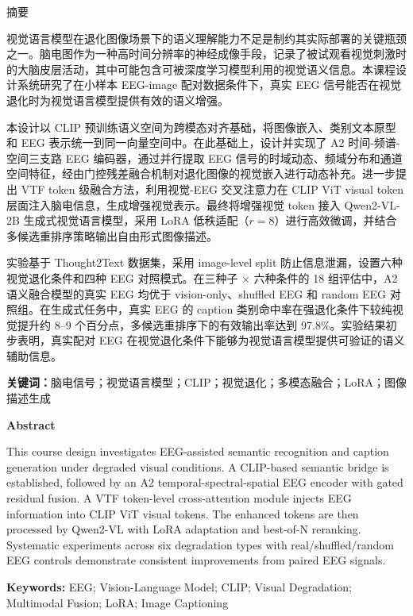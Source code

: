 \begin{center}
{\heitifont{} 摘\quad 要}
\end{center}

视觉语言模型在退化图像场景下的语义理解能力不足是制约其实际部署的关键瓶颈之一。脑电图作为一种高时间分辨率的神经成像手段，记录了被试观看视觉刺激时的大脑皮层活动，其中可能包含可被深度学习模型利用的视觉语义信息。本课程设计系统研究了在小样本 EEG-image 配对数据条件下，真实 EEG 信号能否在视觉退化时为视觉语言模型提供有效的语义增强。

本设计以 CLIP 预训练语义空间为跨模态对齐基础，将图像嵌入、类别文本原型和 EEG 表示统一到同一向量空间中。在此基础上，设计并实现了 A2 时间-频谱-空间三支路 EEG 编码器，通过并行提取 EEG 信号的时域动态、频域分布和通道空间特征，经由门控残差融合机制对退化图像的视觉嵌入进行动态补充。进一步提出 VTF token 级融合方法，利用视觉-EEG 交叉注意力在 CLIP ViT visual token 层面注入脑电信息，生成增强视觉表示。最终将增强视觉 token 接入 Qwen2-VL-2B 生成式视觉语言模型，采用 LoRA 低秩适配（$r=8$）进行高效微调，并结合多候选重排序策略输出自由形式图像描述。

实验基于 Thought2Text 数据集，采用 image-level split 防止信息泄漏，设置六种视觉退化条件和四种 EEG 对照模式。在三种子 × 六种条件的 18 组评估中，A2 语义融合模型的真实 EEG 均优于 vision-only、shuffled EEG 和 random EEG 对照组。在生成式任务中，真实 EEG 的 caption 类别命中率在强退化条件下较纯视觉提升约 8--9 个百分点，多候选重排序下的有效输出率达到 97.8\%。实验结果初步表明，真实配对 EEG 在视觉退化条件下能够为视觉语言模型提供可验证的语义辅助信息。

\vspace{0.5cm}
\noindent\textbf{关键词：}脑电信号；视觉语言模型；CLIP；视觉退化；多模态融合；LoRA；图像描述生成

\clearpage
\begin{center}
{\bfseries{} Abstract}
\end{center}

This course design investigates EEG-assisted semantic recognition and caption generation under degraded visual conditions. A CLIP-based semantic bridge is established, followed by an A2 temporal-spectral-spatial EEG encoder with gated residual fusion. A VTF token-level cross-attention module injects EEG information into CLIP ViT visual tokens. The enhanced tokens are then processed by Qwen2-VL with LoRA adaptation and best-of-N reranking. Systematic experiments across six degradation types with real/shuffled/random EEG controls demonstrate consistent improvements from paired EEG signals.

\vspace{0.5cm}
\noindent\textbf{Keywords:} EEG; Vision-Language Model; CLIP; Visual Degradation; Multimodal Fusion; LoRA; Image Captioning
